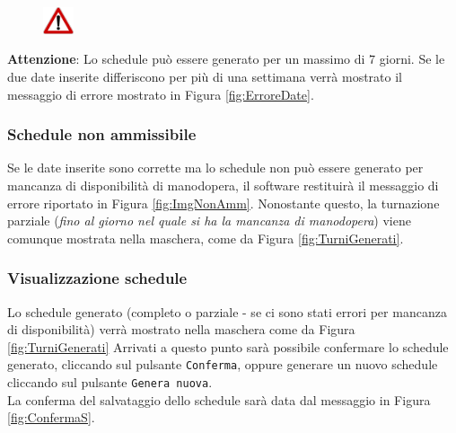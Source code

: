 \noindent
\begin{figure}
    \centering
    \includegraphics[width=0.08\textwidth]{img/Attenzione}
\end{figure}

\noindent
\textbf{Attenzione}: Lo schedule può essere generato per un massimo di $7$ giorni. Se le due date inserite differiscono per più di una settimana verrà mostrato il messaggio di errore mostrato in Figura \ref{fig:ErroreDate}.
\subsubsection{Schedule non ammissibile}
Se le date inserite sono corrette ma lo schedule non può essere generato per mancanza di disponibilità di manodopera, il software restituirà il messaggio di errore riportato in Figura \ref{fig:ImgNonAmm}.
\noindent
Nonostante questo, la turnazione parziale (\textit{fino al giorno nel quale si ha la mancanza di manodopera}) viene comunque mostrata nella maschera, come da Figura \ref{fig:TurniGenerati}.
\subsubsection{Visualizzazione schedule}
Lo schedule generato (completo o parziale - se ci sono stati errori per mancanza di disponibilità) verrà mostrato nella maschera come da Figura \ref{fig:TurniGenerati}
\noindent
Arrivati a questo punto sarà possibile confermare lo schedule generato, cliccando sul pulsante \verb|Conferma|, oppure generare un nuovo schedule cliccando sul pulsante \verb|Genera nuova|.\\
La conferma del salvataggio dello schedule sarà data dal messaggio in Figura \ref{fig:ConfermaS}.
